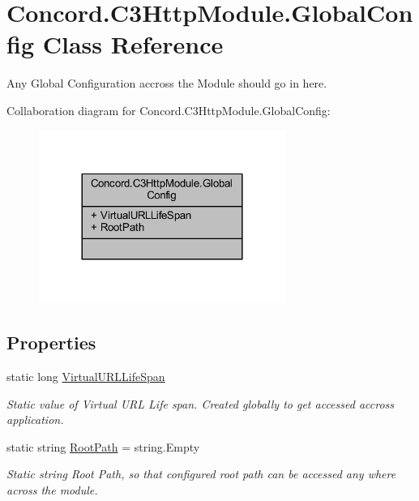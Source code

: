 \hypertarget{class_concord_1_1_c3_http_module_1_1_global_config}{}\section{Concord.\+C3\+Http\+Module.\+Global\+Config Class Reference}
\label{class_concord_1_1_c3_http_module_1_1_global_config}


Any Global Configuration accross the Module should go in here.  




Collaboration diagram for Concord.\+C3\+Http\+Module.\+Global\+Config\+:\nopagebreak
\begin{figure}[H]
\begin{center}
\leavevmode
\includegraphics[width=228pt]{class_concord_1_1_c3_http_module_1_1_global_config__coll__graph}
\end{center}
\end{figure}
\subsection*{Properties}
\begin{DoxyCompactItemize}
\item 
static long \mbox{\hyperlink{class_concord_1_1_c3_http_module_1_1_global_config_a9ff6ba552706a86c5ef0ecfa108a9d84}{Virtual\+U\+R\+L\+Life\+Span}}
\begin{DoxyCompactList}\small\item\em Static value of Virtual U\+RL Life span. Created globally to get accessed accross application. \end{DoxyCompactList}\item 
static string \mbox{\hyperlink{class_concord_1_1_c3_http_module_1_1_global_config_a21a3589b22cff498ecd2828fdecf1213}{Root\+Path}} = string.\+Empty
\begin{DoxyCompactList}\small\item\em Static string Root Path, so that configured root path can be accessed any where across the module. \end{DoxyCompactList}\end{DoxyCompactItemize}


